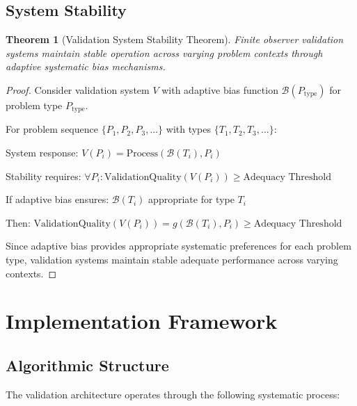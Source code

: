 \documentclass[12pt,a4paper]{article}
\newtheorem{theorem}{Theorem}
\begin{document}
\subsection{System Stability}

\begin{theorem}[Validation System Stability Theorem]
Finite observer validation systems maintain stable operation across varying problem contexts through adaptive systematic bias mechanisms.
\end{theorem}

\begin{proof}
Consider validation system $V$ with adaptive bias function $\mathcal{B}(P_{\text{type}})$ for problem type $P_{\text{type}}$.

For problem sequence $\{P_1, P_2, P_3, ...\}$ with types $\{T_1, T_2, T_3, ...\}$:

System response: $V(P_i) = \text{Process}(\mathcal{B}(T_i), P_i)$

Stability requires: $\forall P_i : \text{ValidationQuality}(V(P_i)) \geq \text{Adequacy Threshold}$

If adaptive bias ensures: $\mathcal{B}(T_i)$ appropriate for type $T_i$

Then: $\text{ValidationQuality}(V(P_i)) = g(\mathcal{B}(T_i), P_i) \geq \text{Adequacy Threshold}$

Since adaptive bias provides appropriate systematic preferences for each problem type, validation systems maintain stable adequate performance across varying contexts.
\end{proof}

\section{Implementation Framework}

\subsection{Algorithmic Structure}

The validation architecture operates through the following systematic process:
\end{document}
